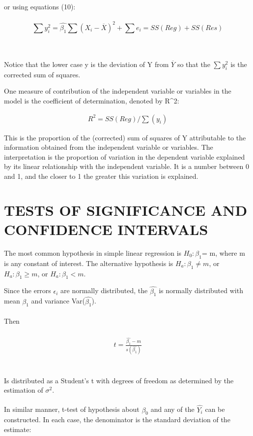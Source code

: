 \documentclass[letterpaper,11pt]{article}
\begin{document}
	\\ \\
	or using equations (10):
	\\ \\
	
		\begin{equation}
		\sum{y_{i}^2}= \hat{\beta_{1}} \sum (X_{i}- \overline{X})^2 + \sum{e_{i}} = SS(Reg) + SS(Res)
		\end{equation}
	
	\\ \\
	Notice that the lower case y is the deviation of Y from $\overline{Y}$ so that the $\sum y_{i}^2$ is the corrected sum of squares.
	
	One measure of contribution of the independent variable or variables in the model is the coefficient of determination, denoted by R^2:

	\begin{equation}	
	\begin{gathered}
	R^2= SS(Reg)/ \sum(y_{i})
	\end{gathered}
	\end{equation}
	
	This is the proportion of the (corrected) sum of squares of Y attributable to the information obtained from the independent variable or 
	variables. The interpretation is the proportion of variation in the dependent variable 
	explained by its linear relationship with the independent variable. It is a number between 0 and 1, and the closer to 1 the greater this 
	variation is explained. 

\section{TESTS OF SIGNIFICANCE AND CONFIDENCE INTERVALS}
	The most common hypothesis in simple linear regression is $H_{0}: \beta_{1}$= m, where m is any constant of interest.
	The alternative hypothesis is $H_{a}: \beta_{1} \neq m$, or $H_{a}: \beta_{1} \geq m$, or $H_{a}: \beta_{1} < m$.
	
	Since the errors $\epsilon_{i}$ are normally distributed, the $\hat{\beta_{1}}$ is normally distributed with mean $\beta_{1}$ and variance 
	Var($\hat{\beta_{1}}$).
	\\ \\
	Then 
	\\ \\
	\begin{equation}	
	\begin{gathered}
	t=\frac{ \hat{\beta_{1}} - m } { s(\hat{\beta_{1}}) }
	\end{gathered}
	\end{equation}			
	\\ \\
	Is distributed as a Student's t with degrees of freedom as determined by the estimation of $\sigma^2$.
	\\ \\
	In similar manner, t-test of hypothesis about $\beta_{0}$ and any of the $\hat {Y_{i}}$ can be constructed. In each case, the denominator 
	is the standard deviation of the estimate:
	
\end{document}
